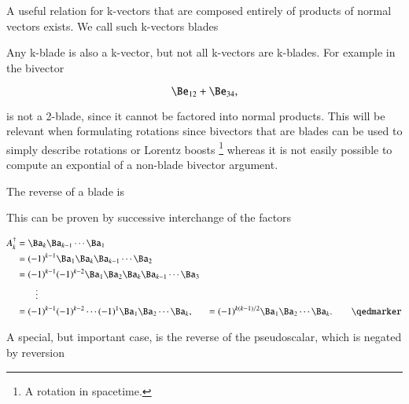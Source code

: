 %
%


A useful relation for k-vectors that are composed entirely of products of normal vectors exists.  We call such k-vectors blades


Any k-blade is also a k-vector, but not all k-vectors are k-blades.  For example in  the bivector

\begin{dmath}\label{eqn:reverse:n}
\Be_{12} + \Be_{34},
\end{dmath}

is not a 2-blade, since it cannot be factored into normal products.  
This will be relevant when formulating rotations since bivectors that are blades can be used to simply describe rotations or Lorentz boosts
\footnote{A rotation in spacetime.} whereas it is not easily possible to compute an expontial of a non-blade bivector argument.

The reverse of a blade is


This can be proven by successive interchange of the factors

\begin{dmath}\label{eqn:scalarPermutation:81}
\begin{aligned}
A_k^\dagger
&= \Ba_k \Ba_{k-1} \cdots \Ba_1 \\
&= (-1)^{k-1} \Ba_1 \Ba_k \Ba_{k-1} \cdots \Ba_2 \\
&= (-1)^{k-1} (-1)^{k-2} \Ba_1 \Ba_2 \Ba_k \Ba_{k-1} \cdots \Ba_3 \\
&\qquad \vdots \\
&= (-1)^{k-1} (-1)^{k-2} \cdots (-1)^1 \Ba_1 \Ba_2 \cdots \Ba_k,
&= (-1)^{k(k-1)/2} \Ba_1 \Ba_2 \cdots \Ba_k. \qquad \qedmarker
\end{aligned}
\end{dmath}

A special, but important case, is the reverse of the  pseudoscalar, which is negated by reversion


